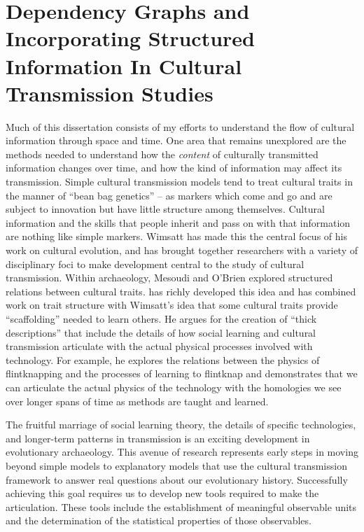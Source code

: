 \section{Dependency Graphs and Incorporating Structured Information In Cultural Transmission Studies}

Much of this dissertation consists of my efforts to understand the flow of cultural information through space and time. One area that remains unexplored are the methods needed to understand how the \emph{content} of culturally transmitted information changes over time, and how the kind of information may affect its transmission. Simple cultural transmission models tend to treat cultural traits in the manner of ``bean bag genetics'' – as markers which come and go and are subject to innovation but have little structure among themselves. Cultural information and the skills that people inherit and pass on with that information are nothing like simple markers. Wimsatt \citep{wimsatt2007reproducing,wimsatt2013articulating,Wimsatt2014,wimsatt2019articulating} has made this the central focus of his work on cultural evolution, and has brought  together researchers with a variety of disciplinary foci to make development central to the study of cultural transmission. Within archaeology, Mesoudi and O’Brien \citeyear{mesoudi2008learning} explored structured relations between cultural traits.  \citet{tostevin2019content} has richly developed this idea and has combined work on trait structure with Wimsatt’s idea that some cultural traits provide ``scaffolding'' needed to learn others. He argues for the creation of ``thick descriptions'' that include the details of how social learning and cultural transmission articulate with the actual physical processes involved with technology. For example, he explores the relations between the physics of flintknapping and the processes of learning to flintknap and demonstrates that we can articulate the actual physics of the technology with the homologies we see over longer spans of time as methods are taught and learned.

The fruitful marriage of social learning theory, the details of specific technologies, and longer-term patterns in transmission is an exciting development in evolutionary archaeology. This avenue of research represents early steps in moving beyond simple models to explanatory models that use the cultural transmission framework to answer real questions about our evolutionary history. Successfully achieving this goal requires us to develop new tools required to make the articulation. These tools include the establishment of meaningful observable units and the determination of the statistical properties of those observables. 

